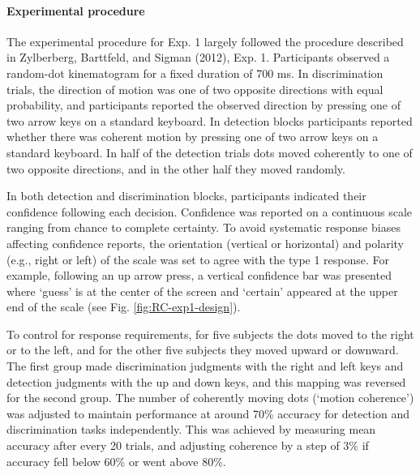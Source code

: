 \documentclass[
  english,
  man]{apa6}
\let\oldparagraph\paragraph
\renewcommand{\paragraph}[1]{\oldparagraph{#1}\mbox{}}
\begin{document}
\hypertarget{experimental-procedure}{%
\paragraph{Experimental procedure}\label{experimental-procedure}}

The experimental procedure for Exp. 1 largely followed the procedure described in Zylberberg, Barttfeld, and Sigman (2012), Exp. 1. Participants observed a random-dot kinematogram for a fixed duration of 700 ms. In discrimination trials, the direction of motion was one of two opposite directions with equal probability, and participants reported the observed direction by pressing one of two arrow keys on a standard keyboard. In detection blocks participants reported whether there was coherent motion by pressing one of two arrow keys on a standard keyboard. In half of the detection trials dots moved coherently to one of two opposite directions, and in the other half they moved randomly.

In both detection and discrimination blocks, participants indicated their confidence following each decision. Confidence was reported on a continuous scale ranging from chance to complete certainty. To avoid systematic response biases affecting confidence reports, the orientation (vertical or horizontal) and polarity (e.g., right or left) of the scale was set to agree with the type 1 response. For example, following an up arrow press, a vertical confidence bar was presented where `guess' is at the center of the screen and `certain' appeared at the upper end of the scale (see Fig. \ref{fig:RC-exp1-design}).

To control for response requirements, for five subjects the dots moved to the right or to the left, and for the other five subjects they moved upward or downward. The first group made discrimination judgments with the right and left keys and detection judgments with the up and down keys, and this mapping was reversed for the second group. The number of coherently moving dots (`motion coherence') was adjusted to maintain performance at around 70\% accuracy for detection and discrimination tasks independently. This was achieved by measuring mean accuracy after every 20 trials, and adjusting coherence by a step of 3\% if accuracy fell below 60\% or went above 80\%.
\end{document}
